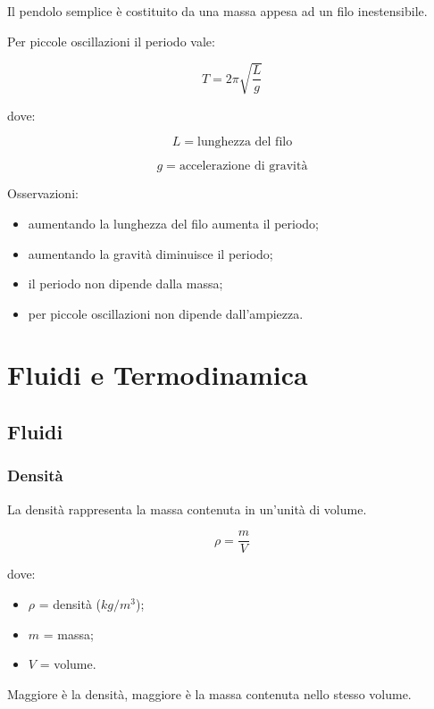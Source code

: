 \noindent Il pendolo semplice è costituito da una massa appesa ad un filo inestensibile.

\vspace{0.3cm}

\noindent Per piccole oscillazioni il periodo vale:

\[
T=2\pi\sqrt{\frac{L}{g}}
\]

\noindent dove:

\[
L=\text{lunghezza del filo}
\]

\[
g=\text{accelerazione di gravità}
\]

\vspace{0.3cm}

\noindent Osservazioni:

\begin{itemize}
\item aumentando la lunghezza del filo aumenta il periodo;
\item aumentando la gravità diminuisce il periodo;
\item il periodo non dipende dalla massa;
\item per piccole oscillazioni non dipende dall'ampiezza.
\end{itemize}
\chapter{Fluidi e Termodinamica}

\section{Fluidi}

\subsection{Densità}

La densità rappresenta la massa contenuta in un'unità di volume.

\[
\rho=\frac{m}{V}
\]

\noindent dove:

\begin{itemize}
    \item $\rho$ = densità ($kg/m^3$);
    \item $m$ = massa;
    \item $V$ = volume.
\end{itemize}

\noindent Maggiore è la densità, maggiore è la massa contenuta nello stesso volume.


